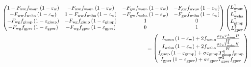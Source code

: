 \begin{landscape}
  \begin{equation}
    \begin{aligned}
      \left(\begin{matrix}1-F_{\mathrm{ww}}f_{\mathrm{wsun}}\left(1-\varepsilon_{\rm w}\right)&-F_{\mathrm{ww}}f_{\mathrm{wsun}}\left(1-\varepsilon_{\rm w}\right)&-F_{\mathrm{gw}}f_{\mathrm{wsun}}\left(1-\varepsilon_{\rm w}\right)&-F_{\mathrm{gw}}f_{\mathrm{wsun}}\left(1-\varepsilon_{\rm w}\right)\\-F_{\mathrm{ww}}f_{\mathrm{wsha}}\left(1-\varepsilon_{\rm w}\right)&1-F_{\mathrm{ww}}f_{\mathrm{wsha}}\left(1-\varepsilon_{\rm w}\right)&-F_{\mathrm{gw}}f_{\mathrm{wsha}}\left(1-\varepsilon_{\rm w}\right)&-F_{\mathrm{gw}}f_{\mathrm{wsha}}\left(1-\varepsilon_{\rm w}\right)\\-F_{\mathrm{wg}}f_{\mathrm{gimp}}\left(1-\varepsilon_{\mathrm{gimp}}\right)&-F_{\mathrm{wg}}f_{\mathrm{gimp}}\left(1-\varepsilon_{\mathrm{gimp}}\right)&1&0\\-F_{\mathrm{wg}}f_{\mathrm{gper}}\left(1-\varepsilon_{\mathrm{gper}}\right)&-F_{\mathrm{wg}}f_{\mathrm{gper}}\left(1-\varepsilon_{\mathrm{gper}}\right)&0&1\\\end{matrix}\right)
      \left(\begin{matrix}L_{\mathrm{wsun}}^\uparrow\\L_{\mathrm{wsha}}^\uparrow\\L_{\mathrm{gimp}}^\uparrow\\L_{\mathrm{gper}}^\uparrow\\\end{matrix}\right)\\
      =\left(\begin{matrix}I_{\mathrm{wsun}}\left(1-\varepsilon_{\rm w}\right)+2f_{\mathrm{wsun}}\frac{\sigma\varepsilon_{\rm w}T_{\mathrm{wsun}}^4H}{W}\\I_{\mathrm{wsha}}\left(1-\varepsilon_{\rm w}\right)+2f_{\mathrm{wsha}}\frac{\sigma\varepsilon_{\rm w}T_{\mathrm{wsha}}^4H}{W}\\I_{\mathrm{gimp}}\left(1-\varepsilon_{\mathrm{gimp}}\right)+\sigma\varepsilon_{\mathrm{gimp}}T_{\mathrm{gimp}}^4f_{\mathrm{gimp}}\\I_{\mathrm{gper}}\left(1-\varepsilon_{\mathrm{gper}}\right)+\sigma\varepsilon_{\mathrm{gper}}T_{\mathrm{gper}}^4f_{\mathrm{gper}}\\\end{matrix}\right)
    \end{aligned}
  \end{equation}
\end{landscape}


